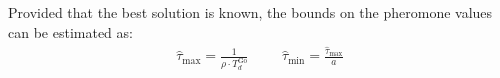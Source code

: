 \begin{homeworkProblem}
Provided that the best solution is known, the bounds on the pheromone values can be estimated as:
\begin{equation}
\begin{array}{lccr}
  \hat{\tau}_{\max} = \frac{1}{\rho \cdot T_{d}^{\text{Go}}} & & & \hat{\tau}_{\min} = \frac{\hat{\tau}_{\max}}{a}
\end{array}
\end{equation}

 







\end{homeworkProblem}
